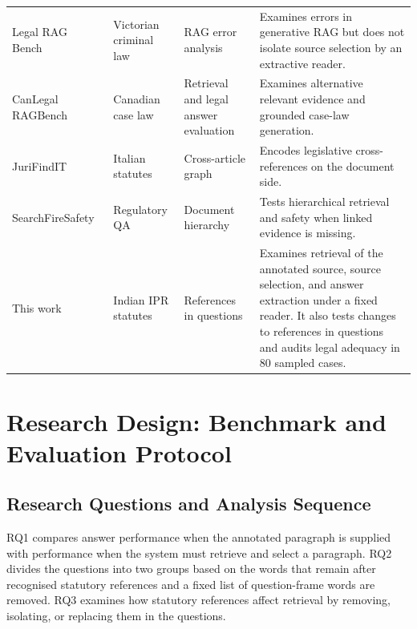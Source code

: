 \documentclass[pdflatex,sn-basic]{sn-jnl}%
\theoremstyle{thmstyleone}%
\theoremstyle{thmstyletwo}%
\theoremstyle{thmstylethree}%
\begin{document}
\begin{table}[!htbp]
\begin{tabular}{@{}
        >{\raggedright\arraybackslash}p{2.7cm}
        >{\raggedright\arraybackslash}p{1.7cm}
        >{\raggedright\arraybackslash}p{1.9cm}
        >{\raggedright\arraybackslash}p{5.1cm}@{}}
        Legal RAG Bench~\citep{butler2026legalragbench}
        & Victorian criminal law
        & RAG error analysis
        & Examines errors in generative RAG but does not isolate source
        selection by an extractive reader. \\
        \addlinespace[2pt]

        CanLegal RAGBench~\citep{zhao2026canlegalragbench}
        & Canadian case law
        & Retrieval and legal answer evaluation
        & Examines alternative relevant evidence and grounded case-law
        generation. \\
        \addlinespace[2pt]

        Juri\-FindIT~\citep{noceJuriFindITItalian2026}
        & Italian statutes
        & Cross-article graph
        & Encodes legislative cross-references on the document side. \\
        \addlinespace[2pt]

        Search\-Fire\-Safety~\citep{chaeStructureAwareStatuteQA2026}
        & Regulatory QA
        & Document hierarchy
        & Tests hierarchical retrieval and safety when linked evidence is
        missing. \\
        \addlinespace[2pt]

        This work
        & Indian IPR statutes
        & References in questions
        & Examines retrieval of the annotated source, source selection, and
        answer extraction under a fixed reader. It also tests changes to
        references in questions and audits legal adequacy in 80 sampled cases.
        \\
        \bottomrule
    \end{tabular}
\end{table}


\section{Research Design: Benchmark and Evaluation Protocol}
\label{sec:experimental_setup}

\subsection{Research Questions and Analysis Sequence}

RQ1 compares answer performance when the annotated paragraph is supplied
with performance when the system must retrieve and select a paragraph.
RQ2 divides the questions into two groups based on the words that remain
after recognised statutory references and a fixed list of question-frame
words are removed. RQ3 examines how statutory references affect retrieval
by removing, isolating, or replacing them in the questions.
\end{document}
